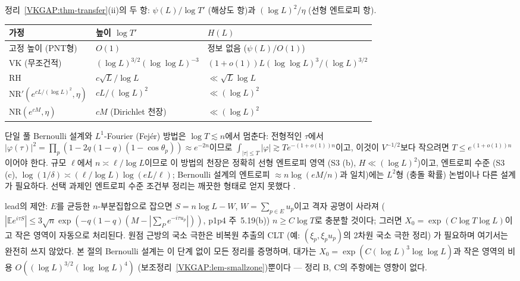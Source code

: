 \begin{remark}[사다리의 해석]\label{VKGAP:rem-ladder}
정리~\ref{VKGAP:thm-transfer}(ii)의 두 항: $\psi(L)/\log T'$ (해상도 항)과 $(\log L)^2/\eta$ (선형 엔트로피 항).
\begin{center}
\begin{tabular}{lll}
\toprule
가정 & 높이 $\log T'$ & $H(L)$ \\
\midrule
고정 높이 (PNT형) & $O(1)$ & 정보 없음 ($\psi(L)/O(1)$) \\
VK (무조건적) & $(\log L)^{3/2}(\log\log L)^{-3}$ & $(1+o(1))L(\log\log L)^3/(\log L)^{3/2}$ \\
RH & $c\sqrt L/\log L$ & $\ll\sqrt L\log L$ \\
$\mathrm{NR}'(e^{cL/(\log L)^2},\eta)$ & $cL/(\log L)^2$ & $\ll(\log L)^2$ \\
$\mathrm{NR}(e^{cM},\eta)$ & $cM$ (Dirichlet 천장) & $\ll(\log L)^2$ \\
\bottomrule
\end{tabular}
\end{center}
\HEUR{} 단일 풀 Bernoulli 설계와 $L^1$-Fourier (Fejér) 방법은 $\log T\lesssim n$에서 멈춘다: 전형적인 $\tau$에서
$|\varphi(\tau)|^2=\prod_p(1-2q(1-q)(1-\cos\theta_p))\approx e^{-2n}$이므로 $\int_{|\tau|\le T}|\varphi|\gtrsim Te^{-(1+o(1))n}$이고,
이것이 $V^{-1/2}$보다 작으려면 $T\le e^{(1+o(1))n}$이어야 한다. 규모 $\ell$에서 $n\asymp\ell/\log L$이므로 이 방법의 천장은 정확히 선형 엔트로피 영역 (S3 (b), $H\ll(\log L)^2$)이고,
엔트로피 수준 (S3 (c), $\log(1/\delta)\asymp(\ell/\log L)\log(eL/\ell)$; Bernoulli 설계의 엔트로피 $\approx n\log(eM/n)$과 일치)에는 $L^2$형 (충돌 확률) 논법이나
다른 설계가 필요하다. 선택 과제인 엔트로피 수준 조건부 정리는 깨끗한 형태로 얻지 못했다 \OPEN.
\end{remark}

\begin{remark}\label{VKGAP:rem-fixedsize}
\HEUR{} lead의 제안: $E$를 균등한 $n$-부분집합으로 잡으면 $S=n\log L-W$, $W=\sum_{p\in E}u_p$이고 격자 공명이 사라져
($|\mathbb{E}e^{i\tau S}|\le3\sqrt n\exp(-q(1-q)(M-|\sum_Pe^{-i\tau u_p}|))$, p1p4 주~5.19(b)) $n\ge C\log T$로 충분할 것이다;
그러면 $X_0=\exp(C\log T\log L)$이고 작은 영역이 자동으로 처리된다. 원점 근방의 국소 극한은 비복원 추출의 CLT
(예: $(\xi_p,\xi_pu_p)$의 2차원 국소 극한 정리) 가 필요하며 여기서는 완전히 쓰지 않았다.
본 절의 Bernoulli 설계는 이 단계 없이 모든 정리를 증명하며, 대가는 $X_0=\exp(C(\log L)^3\log\log L)$과
작은 영역의 비용 $O((\log L)^{3/2}(\log\log L)^4)$ (보조정리~\ref{VKGAP:lem-smallzone})뿐이다 --- 정리 B, C의 주항에는 영향이 없다.
\end{remark}

